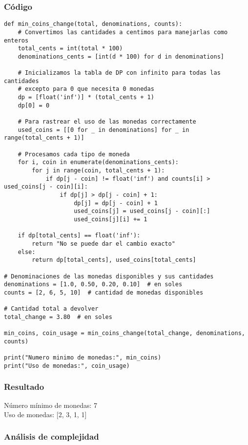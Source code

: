 \subsubsection{Código}
\begin{lstlisting}
def min_coins_change(total, denominations, counts):
    # Convertimos las cantidades a centimos para manejarlas como enteros
    total_cents = int(total * 100)
    denominations_cents = [int(d * 100) for d in denominations]

    # Inicializamos la tabla de DP con infinito para todas las cantidades
    # excepto para 0 que necesita 0 monedas
    dp = [float('inf')] * (total_cents + 1)
    dp[0] = 0

    # Para rastrear el uso de las monedas correctamente
    used_coins = [[0 for _ in denominations] for _ in range(total_cents + 1)]

    # Procesamos cada tipo de moneda
    for i, coin in enumerate(denominations_cents):
        for j in range(coin, total_cents + 1):
            if dp[j - coin] != float('inf') and counts[i] > used_coins[j - coin][i]:
                if dp[j] > dp[j - coin] + 1:
                    dp[j] = dp[j - coin] + 1
                    used_coins[j] = used_coins[j - coin][:]
                    used_coins[j][i] += 1

    if dp[total_cents] == float('inf'):
        return "No se puede dar el cambio exacto"
    else:
        return dp[total_cents], used_coins[total_cents]

# Denominaciones de las monedas disponibles y sus cantidades
denominations = [1.0, 0.50, 0.20, 0.10]  # en soles
counts = [2, 6, 5, 10]  # cantidad de monedas disponibles

# Cantidad total a devolver
total_change = 3.80  # en soles

min_coins, coin_usage = min_coins_change(total_change, denominations, counts)

print("Numero minimo de monedas:", min_coins)
print("Uso de monedas:", coin_usage)
\end{lstlisting}

\subsubsection{Resultado}
Número mínimo de monedas: 7 \\
Uso de monedas: [2, 3, 1, 1]

\subsubsection{Análisis de complejidad}

